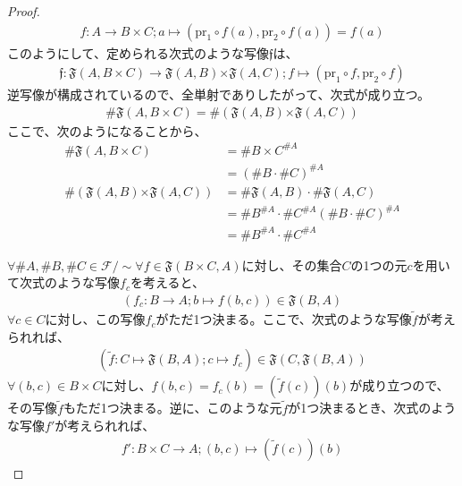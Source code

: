 \documentclass[dvipdfmx]{jsarticle}
\begin{document}
\begin{proof}
\begin{align*}
f:A \rightarrow B \times C;a \mapsto \left( {\mathrm{pr}}_{1} \circ f(a),{\mathrm{pr}}_{2} \circ f(a) \right) = f(a)
\end{align*}
このようにして、定められる次式のような写像$\mathfrak{f}$は、
\begin{align*}
\mathfrak{f:F}(A,B \times C)\mathfrak{\rightarrow F}(A,B)\mathfrak{\times F}(A,C);f \mapsto \left( {\mathrm{pr}}_{1} \circ f,{\mathrm{pr}}_{2} \circ f \right)
\end{align*}
逆写像が構成されているので、全単射でありしたがって、次式が成り立つ。
\begin{align*}
\# {\mathfrak{F}(A,B \times C)} = \# \left( \mathfrak{F}(A,B)\mathfrak{\times F}(A,C) \right)
\end{align*}
ここで、次のようになることから、
\begin{align*}
\# {\mathfrak{F}(A,B \times C)} &= {\# {B \times C}}^{\# A}\\
&= \left( \# B \cdot \# C \right)^{\# A}\\
\# \left( \mathfrak{F}(A,B)\mathfrak{\times F}(A,C) \right) &= \# {\mathfrak{F}(A,B)} \cdot \# {\mathfrak{F}(A,C)}\\
&= {\# B}^{\# A} \cdot {\# C}^{\# A}
\left( \# B \cdot \# C \right)^{\# A} \\
&= {\# B}^{\# A} \cdot {\# C}^{\# A}
\end{align*}\par
$\forall\# A,\# B,\# C \in \mathcal{F} /\sim \forall f \in \mathfrak{F}(B \times C,A)$に対し、その集合$C$の1つの元$c$を用いて次式のような写像$f_{c}$を考えると、
\begin{align*}
\left( f_{c}:B \rightarrow A;b \mapsto f(b,c) \right)\in \mathfrak{F}(B,A)
\end{align*}
$\forall c \in C$に対し、この写像$f_{c}$がただ1つ決まる。ここで、次式のような写像$\widetilde{f}$が考えられれば、
\begin{align*}
\left( \widetilde{f}:C \mapsto \mathfrak{F}(B,A);c \mapsto f_{c} \right)\in \mathfrak{F}\left( C,\mathfrak{F}(B,A) \right)
\end{align*}
$\forall(b,c) \in B \times C$に対し、$f(b,c) = f_{c}(b) = \left( \widetilde{f}(c) \right)(b)$が成り立つので、その写像$\widetilde{f}$もただ1つ決まる。逆に、このような元$\widetilde{f}$が1つ決まるとき、次式のような写像$f'$が考えられれば、
\begin{align*}
f':B \times C \rightarrow A;(b,c) \mapsto \left( \widetilde{f}(c) \right)(b)
\end{align*}

\end{proof}
\end{document}
